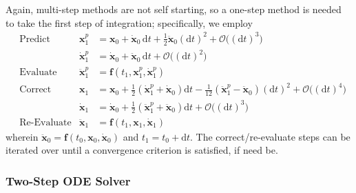 Again, multi-step methods are not self starting, so a one-step method is needed to take the first step of integration; specifically, we employ
\begin{subequations}
    \label{pairedStartUp}
    \begin{align}
    \mbox{} & \text{Predict} & 
    \mathbf{x}_1^p & = \mathbf{x}_0 + \dot{\mathbf{x}}_0 \, \mathrm{d}t +
    \tfrac{1}{2} \ddot{\mathbf{x}}_0 (\mathrm{d}t)^2 + \mathcal{O} \bigl( ( \mathrm{d}t )^3 \bigr)
    \label{startupDisplacementPredictor} \\
    \mbox{} & &
    \dot{\mathbf{x}}^p_1 & = 
    \dot{\mathbf{x}}_0 + \ddot{\mathbf{x}}_0 \, \mathrm{d}t + 
    \mathcal{O} \bigl( ( \mathrm{d}t )^2 \bigr) 
    \label{startUpVelocityPredictor} \\
    \mbox{} & \text{Evaluate} &
    \ddot{\mathbf{x}}^p_1 & = \mathbf{f} (t_1, \mathbf{x}^p_1, \dot{\mathbf{x}}^p_1)
    \label{startUpEvaluate} \\
    \mbox{} & \text{Correct} &
    \mathbf{x}_1 & = \mathbf{x}_0 + \tfrac{1}{2} 
    ( \dot{\mathbf{x}}^p_1 + \dot{\mathbf{x}}_0 ) \mathrm{d}t -
    \tfrac{1}{12} ( \ddot{\mathbf{x}}^p_1 - 
    \ddot{\mathbf{x}}_0 ) (\mathrm{d}t)^2 + \mathcal{O} \bigl( (\mathrm{d}t)^4 \bigr) 
    \label{startupDisplacementCorrector} \\
    \mbox{} & &
    \dot{\mathbf{x}}_1 & = \dot{\mathbf{x}}_0 + \tfrac{1}{2} 
    ( \ddot{\mathbf{x}}_1^p + \ddot{\mathbf{x}}_0 ) \mathrm{d}t + 
    \mathcal{O} \bigl( (\mathrm{d}t)^3 \bigr)
    \label{startUpVelocityCorrector} \\
    \mbox{} & \text{Re-Evaluate} &
    \ddot{\mathbf{x}}_1 & = \mathbf{f} (t_1, \mathbf{x}_1, \dot{\mathbf{x}}_1) 
    \label{startUpReEvaluate}
    \end{align}
\end{subequations}
wherein $\ddot{\mathbf{x}}_0 = \mathbf{f}(t_0, \mathbf{x}_0, \dot{\mathbf{x}}_0)$ and $t_1 = t_0 + \mathrm{d}t$.  The correct\slash re-evaluate steps can be iterated over until a convergence criterion is satisfied, if need be.

\subsubsection{Two-Step ODE Solver}

